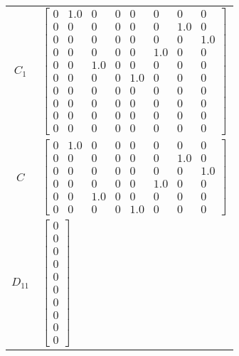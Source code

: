 \begin{tabular}{cl}
 $C_{1}$  & $\left[\begin{matrix}0 & 1.0 & 0 & 0 & 0 & 0 & 0 & 0\\0 & 0 & 0 & 0 & 0 & 0 & 1.0 & 0\\0 & 0 & 0 & 0 & 0 & 0 & 0 & 1.0\\0 & 0 & 0 & 0 & 0 & 1.0 & 0 & 0\\0 & 0 & 1.0 & 0 & 0 & 0 & 0 & 0\\0 & 0 & 0 & 0 & 1.0 & 0 & 0 & 0\\0 & 0 & 0 & 0 & 0 & 0 & 0 & 0\\0 & 0 & 0 & 0 & 0 & 0 & 0 & 0\\0 & 0 & 0 & 0 & 0 & 0 & 0 & 0\\0 & 0 & 0 & 0 & 0 & 0 & 0 & 0\end{matrix}\right]$                                                                                                                                    \\
   $C$    & $\left[\begin{matrix}0 & 1.0 & 0 & 0 & 0 & 0 & 0 & 0\\0 & 0 & 0 & 0 & 0 & 0 & 1.0 & 0\\0 & 0 & 0 & 0 & 0 & 0 & 0 & 1.0\\0 & 0 & 0 & 0 & 0 & 1.0 & 0 & 0\\0 & 0 & 1.0 & 0 & 0 & 0 & 0 & 0\\0 & 0 & 0 & 0 & 1.0 & 0 & 0 & 0\end{matrix}\right]$                                                                                                                                                                                                                                                                \\
 $D_{11}$ & $\left[\begin{matrix}0\\0\\0\\0\\0\\0\\0\\0\\0\\0\end{matrix}\right]$                                                                                                                                                                                                                                                                                                                                                                                                                                        \\

\end{tabular}
